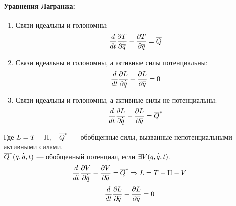 \paragraph*{Уравнения Лагранжа:}
\begin{enumerate}
\item Связи идеальны и голономны:
\[
	\frac{d}{dt}\pd{T}{\dot{\v q}} - \pd{T}{\v q} = \v Q
\]
\item Связи идеальны и голономны, а активные силы потенциальны:
\[
	\frac{d}{dt}\pd{L}{\dot{\v q}} - \pd{L}{\v q} = 0
\]
\item Связи идеальны и голономны, а активные силы не потенциальны:
\[
	\frac{d}{dt}\pd{L}{\dot{\v q}} - \pd{L}{\v q} = \v Q^*
\]
\end{enumerate}
Где $L = T - \Pi, \quad \v Q^*$ --- обобщенные силы, вызванные непотенциальными активными силами.\\
$\v Q^*(\v q, \dot{\v q}, t)$ --- обобщенный потенциал, если $\exists V(\v q, \dot{\v q}, t)$.
\[
	\frac{d}{dt}\pd{V}{\dot{\v q}} - \pd{V}{\v q} = \v Q^*  \Rightarrow L = T - \Pi - V
\]
\[
	\frac{d}{dt}\pd{L}{\v q} - \pd{L}{\v q} = 0
\]
